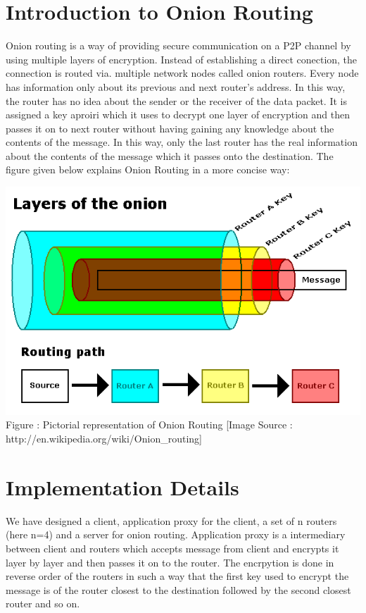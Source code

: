 \documentclass{article}
\begin{document}
\section{Introduction to Onion Routing}
Onion routing is a way of providing secure communication on a P2P channel by using multiple layers of encryption. Instead of establishing a direct conection, the connection is routed via. multiple network nodes called onion routers. Every node has information only about its previous and next router's address. In this way, the router has no idea about the sender or the receiver of the data packet. It is assigned a key aproiri which it uses to decrypt one layer of encryption and then passes it on to next router without having gaining any knowledge about the contents of the message. In this way, only the last router has the real information about the contents of the message which it passes onto the destination.
\newline
\newline
The figure given below explains Onion Routing in a more concise way:
\begin{center}
 \includegraphics[scale=0.4]{Onion_diagram.png}
 \newline
 \small{Figure : Pictorial representation of Onion Routing}
 \newline
 \tiny{[Image Source : http://en.wikipedia.org/wiki/Onion\_routing]}
\end{center}

\section{Implementation Details}
We have designed a client, application proxy for the client, a set of n routers (here n=4) and a server for onion routing. Application proxy is a intermediary between client and routers which accepts message from client and encrypts it layer by layer and then passes it on to the router. The encrpytion is done in reverse order of the routers in such a way that the first key used to encrypt the message is of the router closest to the destination followed by the second closest router and so on.
\end{document}
